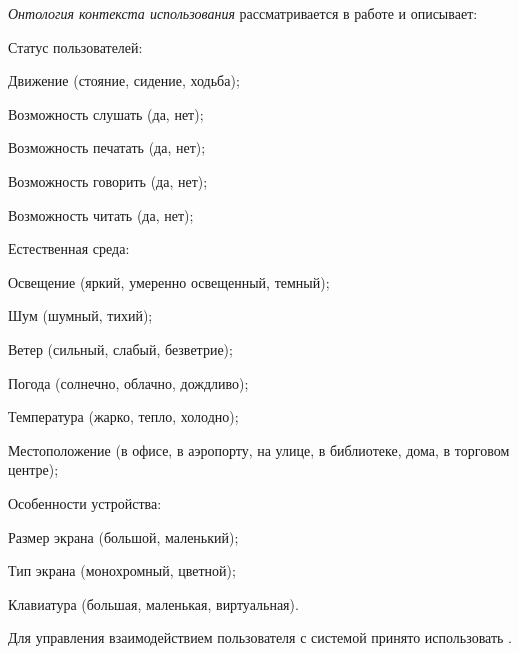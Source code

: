 \textit{Онтология контекста использования} рассматривается в работе  и описывает:
\begin{textitemize}
	\item Статус пользователей:
	\begin{textitemize}
		\item Движение (стояние, сидение, ходьба);
		\item Возможность слушать (да, нет);
		\item Возможность печатать (да, нет);
		\item Возможность говорить (да, нет);
		\item Возможность читать (да, нет);
	\end{textitemize}
	\item Естественная среда:
	\begin{textitemize}
		\item Освещение (яркий, умеренно освещенный, темный);
		\item Шум (шумный, тихий);
		\item Ветер (сильный, слабый, безветрие);
		\item Погода (солнечно, облачно, дождливо);
		\item Температура (жарко, тепло, холодно);
		\item Местоположение (в офисе, в аэропорту, на улице, в библиотеке, дома, в торговом центре);
	\end{textitemize}
	\item Особенности устройства:
	\begin{textitemize}
		\item Размер экрана (большой, маленький);
		\item Тип экрана (монохромный, цветной);
		\item Клавиатура (большая, маленькая, виртуальная).
	\end{textitemize}
\end{textitemize}

Для управления взаимодействием пользователя с системой принято использовать .

